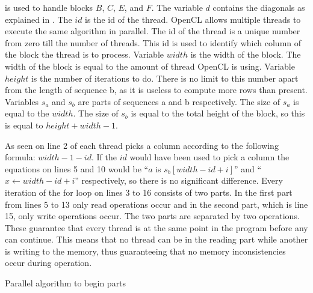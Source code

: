  is used to handle blocks $B$, $C$, $E$, and $F$.
The variable $d$ contains the diagonals as explained in .
The $id$ is the id of the thread.
OpenCL allows multiple threads to execute the same algorithm in parallel.
The id of the thread is a unique number from zero till the number of threads.
This id is used to identify which column of the block the thread is to process.
Variable $width$ is the width of the block.
The width of the block is equal to the amount of thread OpenCL is using.
Variable $height$ is the number of iterations to do.
There is no limit to this number apart from the length of sequence b, as it is useless to compute more rows than present.
Variables $s_a$ and $s_b$ are parts of sequences a and b respectively.
The size of $s_a$ is equal to the $width$.
The size of $s_b$ is equal to the total height of the block, so this is equal to $height + width - 1$.

As seen on line 2 of  each thread picks a column according to the following formula: $width - 1 - id$.
If the $id$ would have been used to pick a column the equations on lines 5 and 10 would be ``$a$ is $s_b[width - id + i]$'' and ``$x \gets width - id + i$'' respectively, so there is no significant difference.
Every iteration of the for loop on lines 3 to 16 consists of two parts.
In the first part from lines 5 to 13 only read operations occur and in the second part, which is line 15, only write operations occur.
The two parts are separated by two  operations.
These guarantee that every thread is at the same point in the program before any can continue.
This means that no thread can be in the reading part while another is writing to the memory, thus guaranteeing that no memory inconsistencies occur during operation.

\begin{algorithm}[p]
\caption{Parallel algorithm to begin parts} \label{begin}
\begin{algorithmic}[1]
    \Statex
    \EndIf
    \Statex
            \Statex
            \Else
            \EndIf
            \Statex
            \Statex
            \Statex
        \Else
        \EndIf
    \EndFor
\EndProcedure
\end{algorithmic}
\end{algorithm}

